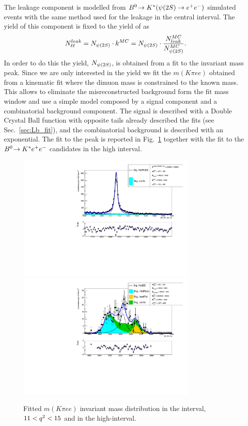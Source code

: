 The \psitwos leakage component is modelled from $\decay{\Bz}{\Kstar(\psitwos\to\ee)}$
simulated events with the same method used for the \jpsi leakage in the central \qsq interval.
The yield of this component is fixed to the yield of \psitwos as
\begin{equation}
N_{\ell\ell}^{leak} = N_{\psitwos} \cdot k^{MC} = N_{\psitwos} \cdot \frac{N_{leak}^{MC}}{N_{\psitwos}^{MC}}.
\end{equation}
 In order to do this the \psitwos yield, $N_{\psitwos}$, is obtained from a fit to the \psitwos invariant
 mass peak. Since we are only interested in the \psitwos yield we fit the $m(K\pi ee)$ obtained from
 a kinematic fit where the dimuon mass is constrained to the known \psitwos mass.
 This allows to eliminate the misreconstructed background form the fit mass window and
 use a simple model composed by a signal component and a combinatorial background component.
 The signal is described with a Double Crystal Ball function with opposite tails
 already described the \Lb fits (see Sec.~\ref{sec:Lb_fit}), and the combinatorial
 background is described with an exponential.
 The fit to the \psitwos peak is reported in Fig.~\ref{fig:fit_ee_highq2}
 together with the fit to the ${{B}^0}\!\rightarrow {\ensuremath{{K}^*}} e^+ e^-$ candidates in the high \qsq interval.
 
\begin{figure}[h!]
\centering
\includegraphics[width=0.8\textwidth]{RKst/figs/fit_EEs_0_EE-q2high-gmc/KstPsiEE_L0E_fitAndRes.pdf}
\includegraphics[width=0.8\textwidth]{RKst/figs/fit_EEs_0_EE-q2high-gmc/KstEE_L0E_fitAndRes.pdf}
\caption{Fitted $m(K\pi ee)$ invariant mass distribution in the \psitwos interval, $11 < {q^2} < 15$ \gevgevcccc
and in the high-\qsq interval. }
\label{fig:fit_ee_highq2}
\end{figure}

